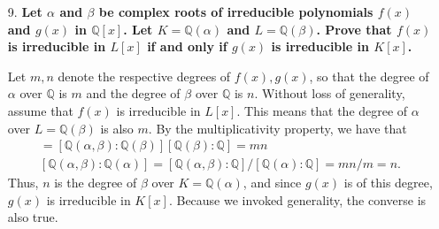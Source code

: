 \documentclass[a4paper,12pt]{article}
\begin{document}
\begin{enumerate}
    \item[9.]
        \boldmath
        \textbf{Let $\alpha$ and $\beta$ be complex roots of irreducible polynomials $f(x)$ and $g(x)$ in $\mathbb{Q}[x]$. Let $K = \mathbb{Q}(\alpha)$ and $L = \mathbb{Q}(\beta)$. Prove that $f(x)$ is irreducible in $L[x]$ if and only if $g(x)$ is irreducible in $K[x]$.} \par
        \unboldmath
        Let $m, n$ denote the respective degrees of $f(x), g(x)$, so that the degree of $\alpha$ over $\mathbb{Q}$ is $m$ and the degree of $\beta$ over $\mathbb{Q}$ is $n$. Without loss of generality, assume that $f(x)$ is irreducible in $L[x]$. This means that the degree of $\alpha$ over $L = \mathbb{Q}(\beta)$ is also $m$. By the multiplicativity property, we have that
        \begin{gather*}
            [\mathbb{Q}(\alpha, \beta) : \mathbb{Q}] = [\mathbb{Q}(\alpha, \beta) : \mathbb{Q}(\beta)][\mathbb{Q}(\beta) : \mathbb{Q}] = mn \\
            [\mathbb{Q}(\alpha, \beta) : \mathbb{Q}(\alpha)] = [\mathbb{Q}(\alpha, \beta) : \mathbb{Q}] / [\mathbb{Q}(\alpha) : \mathbb{Q}] = mn/m = n.
        \end{gather*}
        Thus, $n$ is the degree of $\beta$ over $K = \mathbb{Q}(\alpha)$, and since $g(x)$ is of this degree, $g(x)$ is irreducible in $K[x]$. Because we invoked generality, the converse is also true.
\end{enumerate}
\end{document}
